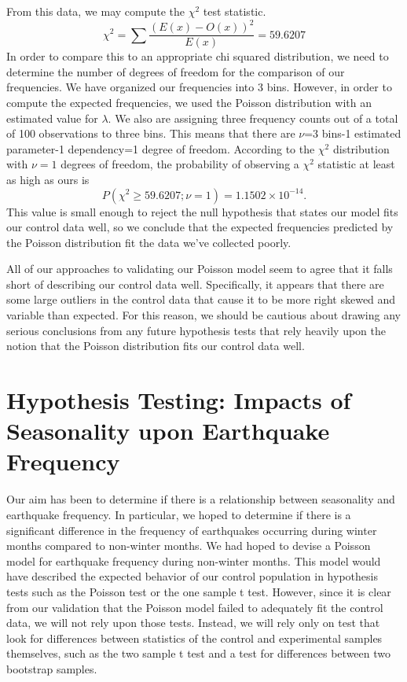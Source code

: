 \documentclass{amsart}
\begin{document}
From this data, we may compute the $\chi^2$ test statistic.
$$\chi^2=\sum\frac{(E(x)-O(x))^2}{E(x)}=59.6207$$
In order to compare this to an appropriate chi squared distribution, we need to determine the number of degrees of freedom for the comparison of our frequencies.  We have organized our frequencies into 3 bins.  However, in order to compute the expected frequencies, we used the Poisson distribution with an estimated value for $\lambda$.  We also are assigning three frequency counts out of a total of 100 observations to three bins. This means that there are $\nu$=3 bins-1 estimated parameter-1 dependency=1 degree of freedom. According to the $\chi^2$ distribution with $\nu=1$ degrees of freedom, the probability of observing a $\chi^2$ statistic at least as high as ours is
$$P(\chi^2\ge 59.6207;\nu=1)=1.1502\times 10^{-14}.$$
This value is small enough to reject the null hypothesis that states our model fits our control data well, so we conclude that the expected frequencies predicted by the Poisson distribution fit the data we've collected poorly.

All of our approaches to validating our Poisson model seem to agree that it falls short of describing our control data well. Specifically, it appears that there are some large outliers in the control data that cause it to be more right skewed and variable than expected. For this reason, we should be cautious about drawing any serious conclusions from any future hypothesis tests that rely heavily upon the notion that the Poisson distribution fits our control data well.
\section{Hypothesis Testing: Impacts of Seasonality upon Earthquake Frequency}
Our aim has been to determine if there is a relationship between seasonality and earthquake frequency. In particular, we hoped to determine if there is a significant difference in the frequency of earthquakes occurring during winter months compared to non-winter months. We had hoped to devise a Poisson model for earthquake frequency during non-winter months. This model would have described the expected behavior of our control population in hypothesis tests such as the Poisson test or the one sample t test. However, since it is clear from our validation that the Poisson model failed to adequately fit the control data, we will not rely upon those tests. Instead, we will rely only on test that look for differences between statistics of the control and experimental samples themselves, such as the two sample t test and a test for differences between two bootstrap samples.
\end{document}
